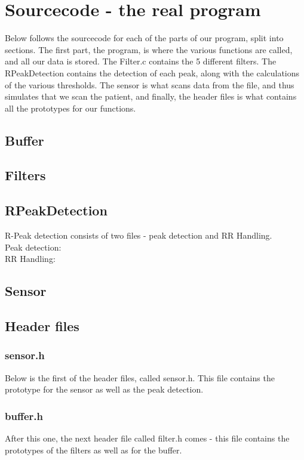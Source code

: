 \documentclass[12pt,a4paper]{article}
\begin{document}
\section{Sourcecode - the real program}
	Below follows the sourcecode for each of the parts of our program, split into sections. The first part, the program, is where the various functions are called, and all our data is stored. The Filter.c contains the 5 different filters. The RPeakDetection contains the detection of each peak, along with the calculations of the various thresholds. The sensor is what scans data from the file, and thus simulates that we scan the patient, and finally, the header files is what contains all the prototypes for our functions.
\subsection{Buffer}
		
\subsection{Filters}
	
\subsection{RPeakDetection}
	R-Peak detection consists of two files - peak detection and RR Handling.\\
	Peak detection:\\
		
	RR Handling:\\
		
\subsection{Sensor}
		
\subsection{Header files}
\subsubsection{sensor.h}
	Below is the first of the header files, called sensor.h. This file contains the prototype for the sensor as well as the peak detection.\\
	
\subsubsection{buffer.h}
	After this one, the next header file called filter.h comes - this file contains the prototypes of the filters as well as for the buffer.\\
	
\end{document}
